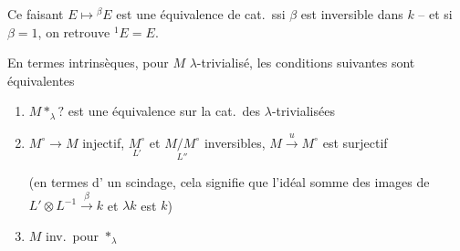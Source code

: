 \documentclass[11pt,a4paper]{article}
\begin{document}
Ce faisant $E \mapsto {}^{\beta}E$ \struck{$\to$} est une équivalence de cat.\ ssi $\beta$ est inversible dans $k$ -- et si $\beta = 1$, on retrouve ${}^{1}E = E$.

En termes intrinsèques,  pour  $M$ $\lambda$-trivialisé, les conditions suivantes sont équivalentes
\begin{enumerate}
  \item $M \mathbin{\ast_\lambda} ?$ est une équivalence sur la cat.\ des $\lambda$-trivialisées
  \item $M^{\circ} \to M$ injectif, $\underset{L'}{M^{\circ}}$ et $\underset{L''}{M/M^{\circ}}$ inversibles, $M \xrightarrow{u} M^{\circ}$ est surjectif

  (en termes d' un scindage, cela signifie que l'idéal somme des images de $L' \otimes L^{-1} \xrightarrow{\beta} k$ et $\lambda k$ est $k$)
  \item $M$ inv.\ pour $\mathbin{\ast_\lambda}$
\end{enumerate}
\end{document}

